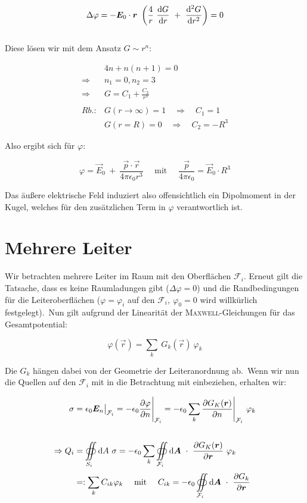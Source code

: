 \begin{equation*}
\Delta\varphi = -\vec{E}_0\cdot\vec{r} \ \left(\frac{4}{r} \ \diff{G}{r} \ + \ \ddiff{G}{r}\right) = 0
\end{equation*}
\ \\
Diese lösen wir mit dem Ansatz $ G \sim r^n$:


\begin{align*}
& 4n + n(n+1) = 0\\
\Rightarrow & n_1 = 0, n_2=3\\
\Rightarrow & G = C_1 + \frac{C_2}{r^3}\\
\ \\
Rb.: & G(r\rightarrow\infty) = 1 \quad \Rightarrow \quad C_1 = 1\\
& G(r=R) = 0 \quad \Rightarrow \quad C_2 = -R^3 
\end{align*}

Also ergibt sich für $\varphi$:

\begin{equation*}
\varphi = \vec{E}_0 \ + \ \frac{\vec{p} \cdot\vec{r}}{4\pi\epsilon_0 r^3} \quad
 \text{ mit } \quad \frac{\vec{p}}{4\pi\epsilon_0} = \vec{E}_0 \cdot R^3
\end{equation*}

Das äußere elektrische Feld induziert also offensichtlich ein Dipolmoment in der Kugel, welches für den zusätzlichen Term in $\varphi$ verantwortlich ist.

\section{Mehrere Leiter}

Wir betrachten mehrere Leiter im Raum mit den Oberflächen $\mathcal{F}_i$. Erneut gilt die Tatsache, dass es keine Raumladungen gibt ($\Delta\varphi = 0$) und die Randbedingungen für die Leiteroberflächen ($\varphi = \varphi_i$ auf den $\mathcal{F}_i, \ \varphi_0 = 0$ wird willkürlich festgelegt).\
Nun gilt aufgrund der Linearität der \textsc{Maxwell}-Gleichungen für das Gesamtpotential:

\begin{equation*}
\varphi (\vec{r}) = \sum_k \ G_k(\vec{r}) \ \varphi_k
\end{equation*}

Die $G_k$ hängen dabei von der Geometrie der Leiteranordnung ab.\
Wenn wir nun die Quellen auf den $\mathcal{F}_i$ mit in die Betrachtung mit einbeziehen, erhalten wir: 

\begin{align*}
\sigma &= \epsilon_0 \vec{E}_n\big|_{\mathcal{F}_i}  = -\epsilon_0 \pdiff{\varphi}{n}\Bigg|_{\mathcal{F}_i} = - \epsilon_0 \sum_k \pdiff{G_K(\vec{r})}{n}\Bigg|_{\mathcal{F}_i} \ \varphi_k \\
\ \\
\Rightarrow Q_i &= \Oiint{S_i}{}{A} \ \sigma = -\epsilon_0\sum_k\Oiint{\mathcal{F}_i}{}{\vec{A}}\  \cdot \ \pdiff{G_K(\vec{r})}{\vec{r}} \ \varphi_k\\
&=: \sum_k C_{ik} \varphi_k \quad \text{ mit } \quad C_{ik} = -\epsilon_0 \Oiint{\mathcal{F}_i}{}{\vec{A}} \ \cdot \ \pdiff{G_k}{\vec{r}}
\end{align*}


